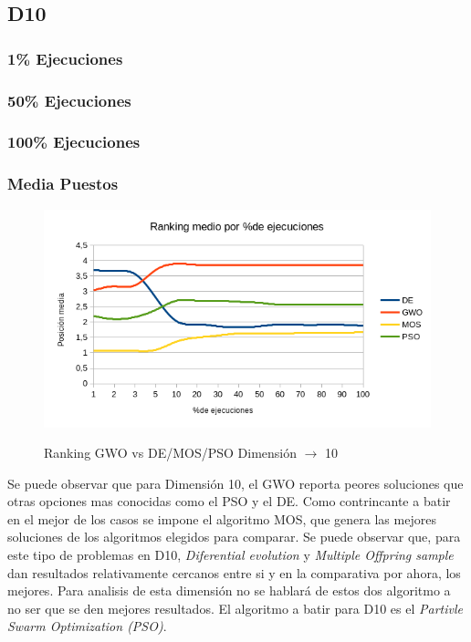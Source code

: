 \documentclass[a4paper]{report}
\begin{document}
\subsection{D10}

\subsubsection*{1\% Ejecuciones}

\subsubsection*{50\% Ejecuciones}


\subsubsection*{100\% Ejecuciones}




\subsubsection*{Media Puestos}



\begin{figure}[H]

    \caption{Ranking GWO vs DE/MOS/PSO Dimensión $\rightarrow$ 10}

    \includegraphics[width=1\textwidth]{Resultados/basico/d10/Grafico_puestos.png} \label{img:ranking-D10}
\end{figure}

Se puede observar que para Dimensión 10, el GWO reporta peores soluciones que otras opciones mas conocidas como el PSO y el DE. Como contrincante a batir en el mejor de los casos se impone el algoritmo MOS, que genera las mejores soluciones de los algoritmos elegidos para comparar. Se puede observar que, para este tipo de problemas en D10, \textit{Diferential evolution} y \textit{Multiple Offpring sample} dan resultados relativamente cercanos entre si y en la comparativa por ahora, los mejores. Para analisis de esta dimensión no se hablará de estos dos algoritmo a no ser que se den mejores resultados. El algoritmo a batir para D10 es el \textit{Partivle Swarm Optimization (PSO)}.
\end{document}
